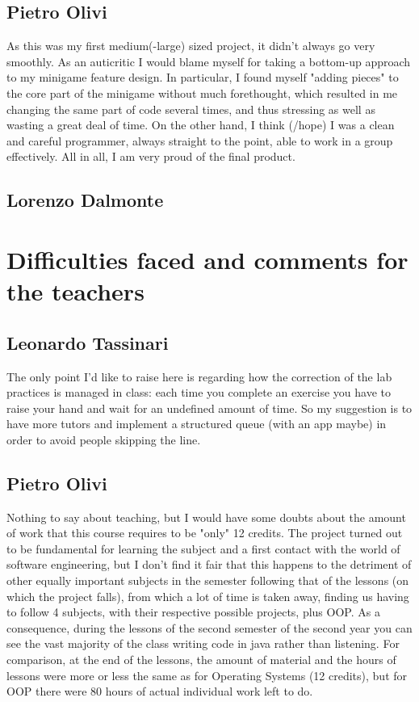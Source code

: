 \documentclass[a4paper,12pt]{report}
\begin{document}
\subsection*{Pietro Olivi}
As this was my first medium(-large) sized project, it didn't always go very smoothly. As an auticritic I would blame myself for taking a bottom-up approach to my minigame 
feature design. In particular, I found myself "adding pieces" to the core part of the minigame without much forethought, which resulted in me changing the same part 
of code several times, and thus stressing as well as wasting a great deal of time. On the other hand, I think (/hope) I was a clean and careful programmer, always 
straight to the point, able to work in a group effectively. All in all, I am very proud of the final product.
\subsection*{Lorenzo Dalmonte}

\section{Difficulties faced and comments for the teachers}
\subsection*{Leonardo Tassinari}
The only point I'd like to raise here is regarding how the correction of the lab practices is managed in class: each time you complete an exercise you have to raise your hand and wait for an undefined amount of time.
So my suggestion is to have more tutors and implement a structured queue (with an app maybe) in order to avoid people skipping the line.
\subsection*{Pietro Olivi}
Nothing to say about teaching, but I would have some doubts about the amount of work that this course requires to be "only" 12 credits. The project turned out to be fundamental for learning the subject and a first 
contact with the world of software engineering, but I don't find it fair that this happens to the detriment of other equally important subjects in the semester following that of the lessons (on which the project falls), 
from which a lot of time is taken away, finding us having to follow 4 subjects, with their respective possible projects, plus OOP. As a consequence, during the lessons of the second semester of the second year you can 
see the vast majority of the class writing code in java rather than listening. For comparison, at the end of the lessons, the amount of material and the hours of lessons were more or less the same as for Operating Systems 
(12 credits), but for OOP there were 80 hours of actual individual work left to do.
\end{document}
